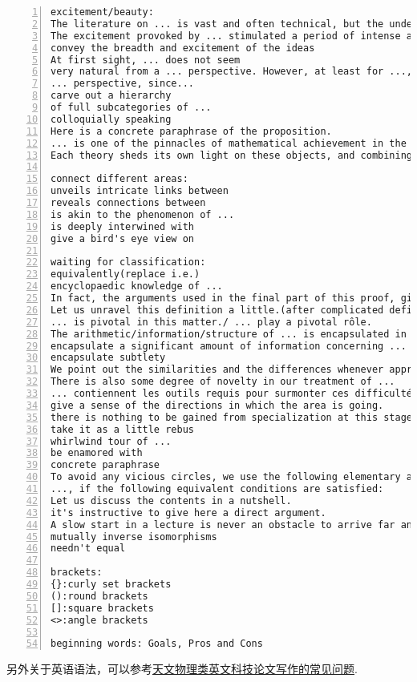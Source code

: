 \documentclass[11pt]{amsart}
\begin{document}
\begin{lstlisting}[numbers=left,numberstyle=\tiny,numbersep=10pt]
excitement/beauty:
The literature on ... is vast and often technical, but the underlying ideas are possessing of an undeniable beauty.
The excitement provoked by ... stimulated a period of intense and widespread activity.
convey the breadth and excitement of the ideas
At first sight, ... does not seem
very natural from a ... perspective. However, at least for ..., ... is important from
... perspective, since...
carve out a hierarchy
of full subcategories of ...
colloquially speaking
Here is a concrete paraphrase of the proposition.
... is one of the pinnacles of mathematical achievement in the 20th century.
Each theory sheds its own light on these objects, and combining the various perspectives is likely to be very fruitful.

connect different areas:
unveils intricate links between
reveals connections between
is akin to the phenomenon of ...
is deeply interwined with
give a bird's eye view on

waiting for classification:
equivalently(replace i.e.)
encyclopaedic knowledge of ...
In fact, the arguments used in the final part of this proof, give the following result.
Let us unravel this definition a little.(after complicated definition)
... is pivotal in this matter./ ... play a pivotal rôle. 
The arithmetic/information/structure of ... is encapsulated in ...
encapsulate a significant amount of information concerning ...
encapsulate subtlety
We point out the similarities and the differences whenever appropriate.
There is also some degree of novelty in our treatment of ...
... contiennent les outils requis pour surmonter ces difficultés.
give a sense of the directions in which the area is going.
there is nothing to be gained from specialization at this stage
take it as a little rebus
whirlwind tour of ...
be enamored with
concrete paraphrase
To avoid any vicious circles, we use the following elementary argument going back to ...
..., if the following equivalent conditions are satisfied:
Let us discuss the contents in a nutshell.
it's instructive to give here a direct argument. 
A slow start in a lecture is never an obstacle to arrive far and present involved advanced material in the end.
mutually inverse isomorphisms
needn't equal

brackets:
{}:curly set brackets
():round brackets
[]:square brackets
<>:angle brackets

beginning words: Goals, Pros and Cons
\end{lstlisting}

另外关于英语语法，可以参考\href{https://arxiv.org/ftp/arxiv/papers/1011/1011.5973.pdf}{天文物理类英文科技论文写作的常见问题}.
\end{document}

